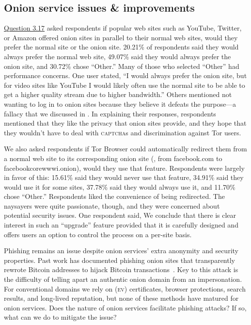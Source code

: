 \subsection{Onion service issues \& improvements}
\label{sec:improve}

\hyperref[q3_17]{Question 3.17} asked respondents if popular web sites such as
YouTube, Twitter, or Amazon offered onion sites in parallel to their normal web
sites, would they prefer the normal site or the onion site. 20.21\% of
respondents said they would always prefer the normal web site, 49.07\% said they
would always prefer the onion site, and 30.72\% chose ``Other.'' Many of those
who selected ``Other'' had performance concerns.  One user stated, ``I would
always prefer the onion site, but for video sites like YouTube I would likely
often use the normal site to be able to get a higher quality stream due to
higher bandwidth.'' Others mentioned not wanting to log in to onion sites
because they believe it defeats the purpose---a fallacy that we discussed in
.  In explaining their responses, respondents mentioned
that they like the privacy that onion sites provide, and they hope that they
wouldn't have to deal with \textsc{captcha}s and discrimination against Tor
users.

We also asked respondents if Tor Browser could automatically redirect them from
a normal web site to its corresponding onion site (\eg, from facebook.com to
facebookcorewwwi.onion), would they use that feature. Respondents were largely
in favor of this: 15.61\% said they would never use that feature, 34.91\% said
they would use it for some sites, 37.78\% said they would always use it, and
11.70\% chose ``Other.'' Respondents liked the convenience of being redirected.
The naysayers were quite passionate, though, and they were concerned about
potential security issues. One respondent said,
We conclude that there is clear interest in such an ``upgrade'' feature provided
that it is carefully designed and offers users an option to control the process
on a per-site basis.

Phishing remains an issue despite onion services' extra anonymity and security
properties.  Past work has documented phishing onion sites that transparently
rewrote Bitcoin addresses to hijack Bitcoin
transactions~\cite{Winter2016a,Nurmi2015a,Monteiro2016a}.  Key to this attack is
the difficulty of telling apart an authentic onion domain from an impersonation.
For conventional domains we rely on (\textsc{ev}) certificates, browser
protections, search results, and long-lived reputation, but none of these
methods have matured for onion services.  Does the nature of onion services
facilitate phishing attacks?  If so, what can we do to mitigate the issue?

